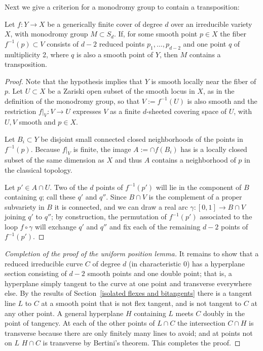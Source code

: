 Next we give a criterion for a monodromy group to contain a transposition:

\begin{lemma}\label{transposition lemma}
Let $f : Y \to X$ be a generically finite cover of degree $d$ over an irreducible variety $X$, with  monodromy group $M \subset S_d$.  
If,  for some smooth point $p \in X$ the fiber $f^{-1}(p)\subset V$ consists of $d-2$ reduced points $p_1,\dots, p_{d-2}$ and one point $q$ of multiplicity 2, where $q$ is also a smooth point of $Y$, then $M$ contains a transposition.
\end{lemma}

\begin{proof} Note that the hypothesis implies that $Y$ is smooth
locally near the fiber of $p$. Let $U \subset X$ be a Zariski open subset of the smooth locus in $X$, as in the definition of the monodromy group, so that  $V := f^{-1}(U)$ is also smooth and the restriction $f|_V : V \to U$ expresses $V$ as a finite $d$-sheeted covering space of $U$, with $U,V$ smooth and $p\in X$.

Let $B_i\subset Y$ be disjoint small connected closed neighborhoods of the points
in $f^{-1}(p)$. Because $f|_V$  is finite, the image $A := \cap f(B_i)$ has is a locally
closed subset of the same dimension as $X$ and thus $A$
 contains a neighborhood
of $p$ in the classical topology.

Let $p' \in A \cap U$. Two of the $d$ points of $f^{-1}(p')$ will lie in the component  of $B$ containing $q$; call these $q'$ and $q''$. Since $B \cap V$ is the complement of a proper subvariety in $B$ it is connected, and we can draw a real arc $\gamma : [0,1] \to B \cap V$ joining $q'$ to $q''$; by construction, the permutation of $f^{-1}(p')$ associated to the loop $f \circ \gamma$ will exchange $q'$ and $q''$ and fix each of the remaining $d-2$ points of $f^{-1}(p')$.
\end{proof}

\begin{proof}[Completion of the proof of the uniform position lemma]
 It remains to show that a reduced irreducible curve $C$ of degree $d$ (in characteristic 0)
 has a hyperplane section consisting of $d-2$ smooth points and one double point; that is, a hyperplane simply tangent to the curve at one point and transverse everywhere else. By the results of 
 Section~\ref{isolated flexes and bitangents} there is a tangent line $L$ to $C$ at a smooth point that is not flex tangent, and is not tangent to $C$ at any other point. A general hyperplane $H$ containing $L$ meets $C$ doubly in the point of
 tangency. At each of the other points of $L\cap C$ the intersection $C\cap H$ is transverse because there are only finitely many lines to avoid; and at points not on $L$ $H\cap C$ is transverse by Bertini's theorem. This completes the proof.
\end{proof}

